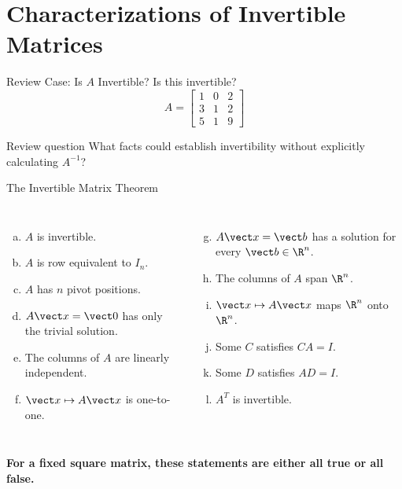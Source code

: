 \section[Invertibility]{Characterizations of Invertible Matrices}

\begin{frame}{Review Case: Is $A$ Invertible?}
Is this invertible?
\[
A=\begin{bmatrix}
1&0&2\\
3&1&2\\
5&1&9
\end{bmatrix}
\]

\pause
\begin{alertblock}{Review question}
What facts could establish invertibility without explicitly calculating $A^{-1}$?
\end{alertblock}
\end{frame}

\begin{frame}{The Invertible Matrix Theorem}
\vspace{-.4ex}
\begin{columns}[T]
\begin{enumerate}[a.]
  \item $A$ is invertible.
  \item $A$ is row equivalent to $I_n$.
  \item $A$ has $n$ pivot positions.
  \item $A\vect x=\vect0$ has only the trivial solution.
  \item The columns of $A$ are linearly independent.
  \item $\vect x\mapsto A\vect x$ is one-to-one.
\end{enumerate}
\begin{enumerate}[a.]
  \setcounter{enumi}{6}
  \item $A\vect x=\vect b$ has a solution for every $\vect b\in\R^n$.
  \item The columns of $A$ span $\R^n$.
  \item $\vect x\mapsto A\vect x$ maps $\R^n$ onto $\R^n$.
  \item Some $C$ satisfies $CA=I$.
  \item Some $D$ satisfies $AD=I$.
  \item $A^T$ is invertible.
\end{enumerate}
\end{columns}
\pause

\vspace{0.1in}

\centering
\textbf{For a fixed square matrix, these statements are either all true or all false.}
\end{frame}


